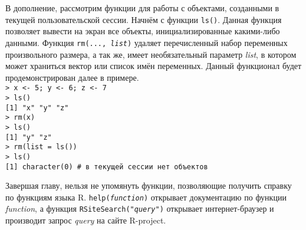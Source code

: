     В дополнение, рассмотрим функции для работы с объектами, созданными в текущей
    пользовательской сессии. Начнём с функции \texttt{ls()}. Данная функция 
    позволяет вывести на экран все объекты, инициализированные какими-либо данными.
    Функция \texttt{rm(..., \textit{list})} удаляет перечисленный набор переменных 
    произвольного размера, а так же, имеет необязательный параметр \textit{list},
    в котором может храниться вектор или список имён переменных. Данный функционал
    будет продемонстрирован далее в примере. \\
    \indent\texttt{> x <- 5; y <- 6; z <- 7} \\
    \indent\texttt{> ls()} \\
    \indent\texttt{[1] "x" "y" "z"} \\
    \indent\texttt{> rm(x)} \\
    \indent\texttt{> ls()} \\
    \indent\texttt{[1] "y" "z"} \\
    \indent\texttt{> rm(list = ls())} \\
    \indent\texttt{> ls()} \\
    \indent\texttt{[1] character(0) \# в текущей сессии нет объектов}

    Завершая главу, нельзя не упомянуть функции, позволяющие получить справку по
    функциям языка R. \texttt{help(\textit{function})} открывает документацию по
    функции \textit{function}, а функция \texttt{RSiteSearch("\textit{query}")}
    открывает интернет-браузер и производит запрос \textit{query} на сайте 
    R-project.
